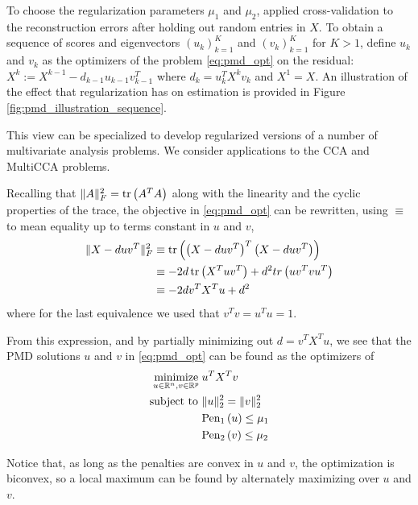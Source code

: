 \documentclass{article}
\begin{document}
To choose the regularization parameters $\mu_{1}$ and $\mu_{2}$,
\citep{witten2009penalized} applied cross-validation to the reconstruction
errors after holding out random entries in $X$. To obtain a sequence of scores
and eigenvectors $\left(u_{k}\right)_{k = 1}^{K}$ and $\left(v_{k}\right)_{k =
  1}^{K}$ for $K > 1$, define $u_{k}$ and $v_{k}$ as the optimizers of the
problem \ref{eq:pmd_opt} on the residual: $X^{k} := X^{k - 1} - d_{k - 1}u_{k -
  1}v_{k - 1}^{T}$ where $d_{k} = u_{k}^{T} X^{k}v_{k}$ and $X^{1} = X$. An
illustration of the effect that regularization has on estimation is provided in
Figure \ref{fig:pmd_illustration_sequence}.


This view can be specialized to develop regularized versions of a number of
multivariate analysis problems. We consider applications to the CCA and
MultiCCA problems.

Recalling that $\|A\|_{F}^{2} = \mathop\mathrm{tr}\left(A^{T}A\right)$ along with the linearity
and the cyclic properties of the trace, the objective in \ref{eq:pmd_opt} can be
rewritten, using $\equiv$ to mean equality up to terms constant in $u$ and $v$,
\begin{align*}
  \|X - duv^{T}\|_{F}^{2} &\equiv \mathop\mathrm{tr}\left(\left(X -
      duv^{T}\right)^{T}\left(X - duv^{T}\right)\right) \\
  &\equiv -2d\mathop\mathrm{tr}\left(X^{T}uv^{T}\right) + d^{2}tr\left(uv^{T}vu^{T}\right) \\
  &\equiv -2d v^{T}X^{T}u + d^{2}
\end{align*}
where for the last equivalence we used that $v^{T}v = u^{T}u = 1$.

From this expression, and by partially minimizing out $d = v^{T}X^{T}u$, we see
that the PMD solutions $u$ and $v$ in \ref{eq:pmd_opt} can be found as the
optimizers of
\begin{align}
\label{eq:pmd_reform}  \mathop\mathrm{minimize}_{u \in \mathbb{R}^{n}, v \in \mathbb{R}^{p}} \medspace &u^{T}X^{T}v \\
  \text{subject to } &\|u\|_{2}^{2} = \|v\|_{2}^{2} \nonumber \\
  &\text{Pen}_{1}\left(u\right) \leq \mu_{1}\nonumber \\
  &\text{Pen}_{2}\left(v\right) \leq \mu_{2} \nonumber
\end{align}

Notice that, as long as the penalties are convex in $u$ and $v$, the
optimization is biconvex, so a local maximum can be found by
alternately maximizing over $u$ and $v$.
\end{document}
